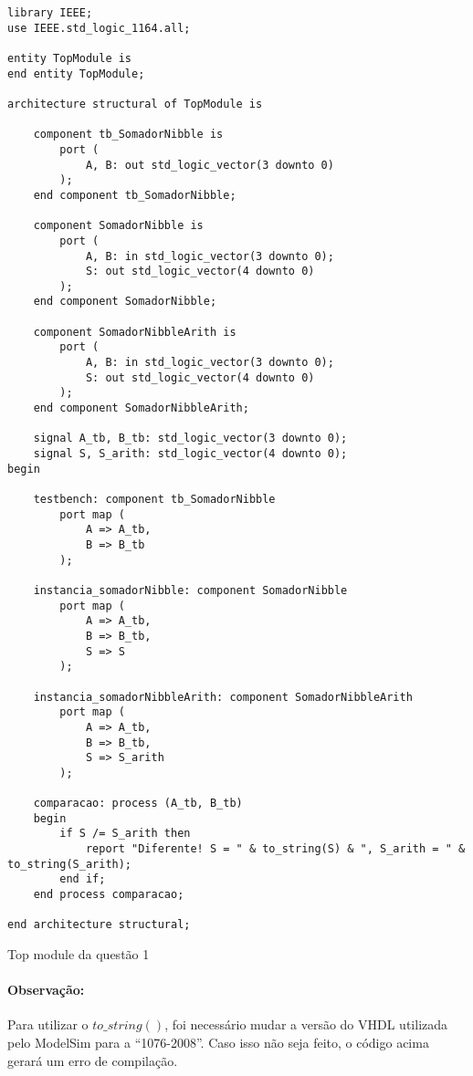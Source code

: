 \documentclass[a4paper,12pt]{article}
\newenvironment{code}{\captionsetup{type=listing}}{}
\begin{document}
\begin{code}
    \begin{verbatim}
library IEEE;
use IEEE.std_logic_1164.all;

entity TopModule is
end entity TopModule;

architecture structural of TopModule is

    component tb_SomadorNibble is
        port (
            A, B: out std_logic_vector(3 downto 0)
        );
    end component tb_SomadorNibble;

    component SomadorNibble is
        port (
            A, B: in std_logic_vector(3 downto 0);
            S: out std_logic_vector(4 downto 0)
        );
    end component SomadorNibble;

    component SomadorNibbleArith is
        port (
            A, B: in std_logic_vector(3 downto 0);
            S: out std_logic_vector(4 downto 0)
        );
    end component SomadorNibbleArith;

    signal A_tb, B_tb: std_logic_vector(3 downto 0);
    signal S, S_arith: std_logic_vector(4 downto 0);
begin

    testbench: component tb_SomadorNibble
        port map (
            A => A_tb,
            B => B_tb
        );
    
    instancia_somadorNibble: component SomadorNibble
        port map (
            A => A_tb,
            B => B_tb,
            S => S
        );
    
    instancia_somadorNibbleArith: component SomadorNibbleArith
        port map (
            A => A_tb,
            B => B_tb,
            S => S_arith
        );

    comparacao: process (A_tb, B_tb)
    begin
        if S /= S_arith then
            report "Diferente! S = " & to_string(S) & ", S_arith = " & to_string(S_arith);
        end if;
    end process comparacao;

end architecture structural;
    \end{verbatim}
    \caption{Top module da questão 1}
\end{code}

\paragraph{Observação:} Para utilizar o $to\_string()$, foi necessário mudar a versão do VHDL utilizada pelo ModelSim para a ``1076-2008''. Caso isso não seja feito, o código acima gerará um erro de compilação.
\end{document}
